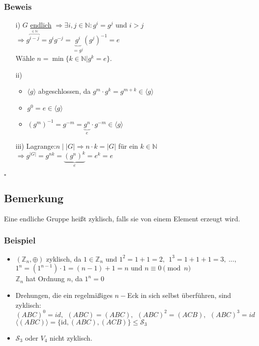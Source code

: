 \documentclass[12pt,titlepage, pdf]{article}
\newcommand{\uline}[1]{\underline{#1}}
\newcommand{\id}{\textrm{id}}
\renewcommand{\>}{\rightarrow}
\renewcommand{\*}{\cdot}
\begin{document}
\subsubsection*{Beweis}
\begin{itemize}
	\item[i)] $G$ \uline{endlich} $\Rightarrow \exists i,j \in \mathbb{N}: g^i = g^j$ und $i > j$ \\
	\noindent\hspace*{17.5mm}$\Rightarrow g^{\overbracket{i-j}^{ \in \mathbb{N}}} = g^i g^{-j} = \underbrace{g^i}_{=g^j} (g^j)^{-1} = e$ \\
	Wähle $n =\min\{k \in \mathbb{N}| g^k = e \}$.
	\item[ii)] 
	\begin{itemize}
		\item $\langle g \rangle$ abgeschlossen, da $g^m \cdot g^k = g^{m+k} \in \langle g \rangle$ 
		\item $g^0 = e \in \langle g \rangle$
		\item $(g^m)^{-1} = g^{-m} = \underbrace{g^n}_{e} \cdot g^{-m} \in \langle g \rangle$
	\end{itemize}
	\item[iii)] Lagrange:\quad $n \mid |G| \Rightarrow n \cdot k = | G |$ für ein $k  \in \mathbb{N}$\\
	\noindent\hspace*{32mm}$\Rightarrow g^{|G|} = g^{nk} =\underbrace{(g^n)^k}_{e} = e^k = e$
\end{itemize}\hfill$\square$
\subsection{Bemerkung}
Eine endliche Gruppe heißt zyklisch, falls sie von einem Element erzeugt wird.
\subsubsection*{Beispiel}
\begin{itemize}
	\item $(\mathbb{Z}_n, \oplus)$ zyklisch, da $1 \in \mathbb{Z}_n$ und $1^2 = 1 + 1 = 2,~~ 1^3 = 1 + 1 +1 = 3,~...,$\\$ 1^n = (1^{n-1}) \cdot 1 = (n -1) + 1 = n\textrm{ und } n \equiv 0 \pmod{n}$ \\
	$\mathbb{Z}_n$ hat Ordnung $n$, da $1^n = 0$
	\item Drehungen, die ein regelmäßiges $n-$Eck in sich selbst überführen, sind zyklisch: \\
	$(ABC)^0 = id,~~ (ABC) = (ABC),~~ (ABC)^2 = (ACB),~~ (ABC)^3 = id$\\
	$\langle (ABC) \rangle = \{\id, (ABC), (ACB)\} \leq \mathscr{S}_3$
	\item $\mathscr{S}_3$ oder $V_4$ nicht zyklisch.
\end{itemize}
\end{document}
